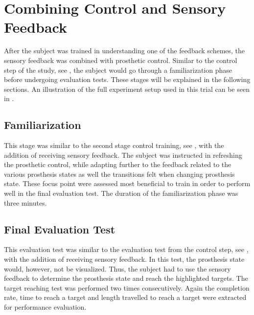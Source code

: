 \section{Combining Control and Sensory Feedback}
After the subject was trained in understanding one of the feedback schemes, the sensory feedback was combined with prosthetic control. Similar to the control step of the study, see , the subject would go through a familiarization phase before undergoing evaluation tests.  These stages will be explained in the following sections. An illustration of the full experiment setup used in this trial can be seen in .

\subsection{Familiarization}
This stage was similar to the second stage control training, see , with the addition of receiving sensory feedback. The subject was instructed in refreshing the prosthetic control, while adapting further to the feedback related to the various prosthesis states as well the transitions felt when changing prosthesis state. These focus point were assessed most beneficial to train in order to perform well in the final evaluation test. The duration of the familiarization phase was three minutes.

\subsection{Final Evaluation Test}
This evaluation test was similar to the evaluation test from the control step, see , with the addition of receiving sensory feedback. In this test, the prosthesis state would, however, not be visualized. Thus, the subject had to use the sensory feedback to determine the prosthesis state and reach the highlighted targets. The target reaching test was performed two times consecutively. Again the completion rate, time to reach a target and length travelled to reach a target were extracted for performance evaluation.

